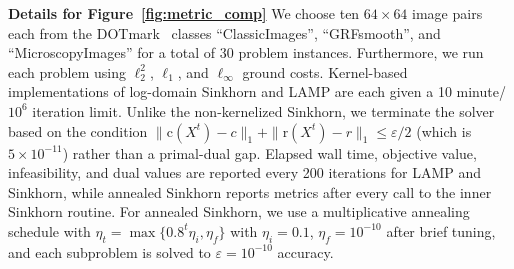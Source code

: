 \documentclass[10pt]{article}
\theoremstyle{plain}
\theoremstyle{definition}
\theoremstyle{remark}
\newcommand{\col}{\bm{\mathrm{c}}}
\newcommand{\row}{\bm{\mathrm{r}}}
\begin{document}
\vspace{1em}\noindent\textbf{Details for Figure~\ref{fig:metric_comp}}
We choose ten $64\times 64$ image pairs each from the DOTmark~\cite{schrieberDOTmarkBenchmarkDiscrete2017} classes ``ClassicImages'', ``GRFsmooth'', and ``MicroscopyImages'' for a total of 30 problem instances. Furthermore, we run each problem using $\ell_2^2$, $\ell_1$, and $\ell_\infty$ ground costs. Kernel-based implementations of log-domain Sinkhorn and LAMP are each given a 10 minute/$10^6$ iteration limit. Unlike the non-kernelized Sinkhorn, we terminate the solver based on the condition $\|\col(X^t)-c\|_1+\|\row(X^t)-r\|_1\leq \varepsilon/2$ (which is $5\times 10^{-11}$) rather than a primal-dual gap. Elapsed wall time, objective value, infeasibility, and dual values are reported every 200 iterations for LAMP and Sinkhorn, while annealed Sinkhorn reports metrics after every call to the inner Sinkhorn routine. For annealed Sinkhorn, we use a multiplicative annealing schedule with $\eta_t=\max\{0.8^t\eta_i,\eta_f\}$ with $\eta_i=0.1$, $\eta_f=10^{-10}$ after brief tuning, and each subproblem is solved to $\varepsilon=10^{-10}$ accuracy.
\end{document}

